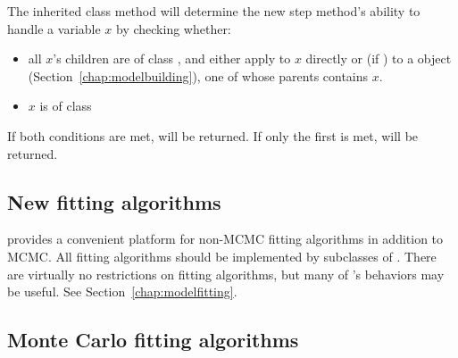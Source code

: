 \documentclass[]{jss}
\begin{document}
The inherited class method  will determine the new step method's ability to handle a variable $x$ by checking whether:
\begin{itemize}
   \item all $x$'s children are of class , and either apply  to $x$ directly or (if ) to a  object (Section~\ref{chap:modelbuilding}), one of whose parents contains $x$.
   \item $x$ is of class 
\end{itemize}
If both conditions are met,  will be returned. If only the first is met,  will be returned.


\subsection{New fitting algorithms} \label{custom-model}


 provides a convenient platform for non-MCMC fitting algorithms in addition to MCMC. All fitting algorithms should be implemented by subclasses of . There are virtually no restrictions on fitting algorithms, but many of 's behaviors may be useful. See Section~\ref{chap:modelfitting}.


\subsection{Monte Carlo fitting algorithms} \label{custom-MC}
\end{document}
